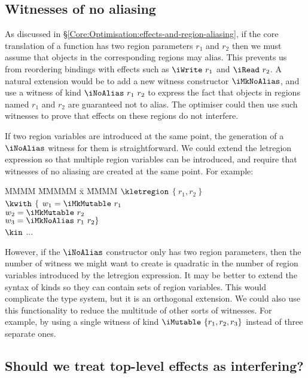 \subsection{Witnesses of no aliasing}
\label{Evaluation:Limits:aliasing}

As discussed in \S\ref{Core:Optimisation:effects-and-region-aliasing}, if the core translation of a function has two region parameters $r_1$ and $r_2$ then we must assume that objects in the corresponding regions may alias. This prevents us from reordering bindings with effects such as $\iWrite \ r_1$ and $\iRead \ r_2$. A natural extension would be to add a new witness constructor $\iMkNoAlias$, and use a witness of kind $\iNoAlias \ r_1 \ r_2$ to express the fact that objects in regions named $r_1$ and $r_2$ are guaranteed not to alias. The optimiser could then use such witnesses to prove that effects on these regions do not interfere.

If two region variables are introduced at the same point, the generation of a $\iNoAlias$ witness for them is straightforward. We could extend the letregion expression so that multiple region variables can be introduced, and require that witnesses of no aliasing are created at the same point. For example:
\begin{tabbing}
	MMMM \= MMMMM \= x \= MMMM\kill
	\> $\kletregion$	\> $\{ \ r_1, r_2 \ \}$ \\
	\> $\kwith$ 
		\> $\{$ \> $w_1 = \iMkMutable \ r_1$ \\ 
	\>	\> 	\> $w_2 = \iMkMutable \ r_2$ \\
	\>	\>	\> $w_3 = \iMkNoAlias \ r_1 \ r_2 \}$  \\
	\> $\kin$ ...
\end{tabbing}

However, if the $\iNoAlias$ constructor only has two region parameters, then the number of witness we might want to create is quadratic in the number of region variables introduced by the letregion expression. It may be better to extend the syntax of kinds so they can contain sets of region variables. This would complicate the type system, but it is an orthogonal extension. We could also use this functionality to reduce the multitude of other sorts of witnesses.  For example, by using a single witness of kind $\iMutable \ \{ r_1, r_2, r_3 \}$ instead of three separate ones.


\subsection{Should we treat top-level effects as interfering?}
\label{Evaluation:Limits:top-level-effects}

